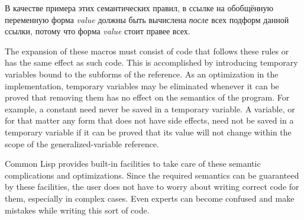 В качестве примера этих семантических правил, в ссылке на обобщённую переменную
 форма \emph{value} должны быть
вычислена \emph{после} всех подформ данной ссылки, потому что форма \emph{value}
стоит правее всех.

The expansion of these macros must consist of code that follows these
rules or has the same effect as such code.  This is accomplished by
introducing temporary variables bound to the subforms of the reference.
As an optimization in the implementation,
temporary variables may be eliminated whenever it
can be proved that removing them has no effect on the semantics of the program.
For example, a constant need never be saved in a temporary variable.
A variable, or for that matter any form that does not have side effects, need not be
saved in a temporary variable if it can be proved that its value will
not change within the scope of the generalized-variable reference.

Common Lisp provides built-in facilities to take care of
these semantic complications and optimizations.  Since the required
semantics can be guaranteed by these facilities, the user does not
have to worry about writing correct code for them, especially in
complex cases.  Even experts can become confused and make mistakes
while writing this sort of code.

